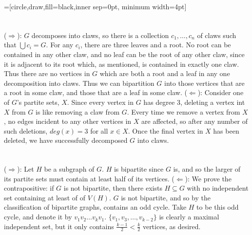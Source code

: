 \documentclass[11pt]{article}
\begin{document}
=[circle,draw,fill=black,inner sep=0pt, minimum width=4pt]

\renewcommand{\thesubsection}{\thesection.\alph{subsection}}

\section{} %
($\Longrightarrow$): $G$ decomposes into claws, so there is a collection $c_1,\ldots,c_n$
of claws such that $\bigcup c_i=G$. For any $c_i$, there are three leaves and a
root. No root can be contained in any other claw, and no leaf can be the root of
any other claw, since it is adjacent to its root which, as mentioned, is
contained in exactly one claw. Thus there are no vertices in $G$ which are
both a root and a leaf in any one decomposition into claws. Thus we can
bipartition $G$ into those vertices that are a root in some claw, and those
that are a leaf in some claw.
\newline
\newline
($\Longleftarrow$): Consider one of $G$'s partite sets, $X$. Since every vertex in
$G$ has degree 3, deleting a vertex int $X$ from $G$ is like removing a claw
from $G$. Every time we remove a vertex from $X$, no edges incident to any
other vertices in $X$ are affected, so after any number of such deletions,
$deg(x)=3$ for all $x\in X$. Once the final vertex in $X$ has been deleted, we
have successfully decomposed $G$ into claws.


\section{} %
($\Longrightarrow$): Let $H$ be a subgraph of $G$. $H$ is bipartite since $G$ is,
and so the larger of its partite sets must contain at least half of its
vertices.
\newline
\newline
($\Longleftarrow$): We prove the contrapositive: if $G$ is not bipartite, then there
exists $H\subseteq G$ with no independent set containing at least of of $V(H)$.
\newline
\newline
$G$ is not bipartite, and so by the classification of bipartite graphs, contains
an odd cycle. Take $H$ to be this odd cycle, and denote it by $v_1v_2\ldots v_k v_1$.
$\{v_1,v_3,\ldots,v_{k-2}\}$ is clearly a maximal independent set, but it only
contains $\frac{k-1}{2}<\frac{k}{2}$ vertices, as desired.
\end{document}
